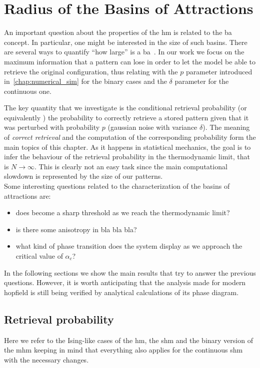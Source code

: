 \documentclass[\rootdir/main.tex]{subfiles}
\begin{document}
\chapter{Radius of the Basins of Attractions}\label{chap:radius}
An important question about the properties of the \acrlong{hm} is related to the \acrlong{ba} concept. In particular, one might be interested in the size of such basins. There are several ways to quantify ``how large'' is a \acrshort{ba}~\parencite[see \eg][]{hamming_radius}. In our work we focus on the maximum information that a pattern can lose in order to let the model be able to retrieve the original configuration, thus relating with the $p$ parameter introduced in~\cref{chap:numerical_sim} for the binary cases and the $\delta$ parameter for the continuous one.

The key quantity that we investigate is the conditional retrieval probability  (or equivalently \pret{\delta}) \ie the probability to correctly retrieve a stored pattern given that it was perturbed with probability $p$ (gaussian noise with variance $\delta$). The meaning of \emph{correct retrieval} and the computation of the corresponding probability form the main topics of this chapter. As it happens in statistical mechanics, the goal is to infer the behaviour of the retrieval probability in the thermodynamic limit, that is $N \to \infty$. This is clearly not an easy task since the main computational slowdown is represented by the size of our patterns.\\
Some interesting questions related to the characterization of the basins of attractions are:
\begin{itemize}
    \item does  become a sharp threshold as we reach the thermodynamic limit?
    \item is there some anisotropy in bla bla bla?
    \item what kind of phase transition does the system display as we approach the critical value of $\alpha_c$?
\end{itemize}
In the following sections we show the main results that try to answer the previous questions. However, it is worth anticipating that the analysis made for modern hopfield is still being verified by analytical calculations of its phase diagram.

\section{Retrieval probability}
Here we refer to the Ising-like cases of the \acrshort{hm}, \ie the \acrshort{shm} and the binary version of the \acrshort{mhm} keeping in mind that everything also applies for the continuous \acrshort{shm} with the necessary changes.
\end{document}
